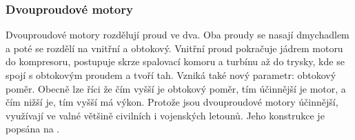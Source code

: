 \subsubsection{Dvouproudové motory}
{Dvouproudové motory rozdělují proud ve dva. Oba proudy se nasají dmychadlem a poté se rozdělí na vnitřní a obtokový. Vnitřní proud pokračuje jádrem motoru do kompresoru, postupuje skrze spalovací komoru a turbínu až do trysky, kde se spojí s obtokovým proudem a tvoří tah. Vzniká také nový parametr: obtokový poměr. Obecně lze říci že čím vyšší je obtokový poměr, tím účinnější je motor, a čím nižší je, tím vyšší má výkon. Protože jsou dvouproudové motory účinnější, využívají ve valné většině civilních i vojenských letounů. Jeho konstrukce je popsána na .}
\cite{VUTB:PrehledTechnickychAspektuVyvojeLeteckychProudovychMotoru}

